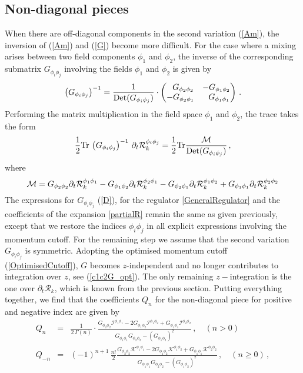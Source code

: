 \documentclass[notitlepage,eqsecnum,bm,amsmath,preprintnumbers,superscriptaddress,nofootinbib,aps,11pt]{revtex4-1}
\def\eq#1{(\ref{#1})}
\def\beq{\begin{equation}}
\def\eeq{\end{equation}}
\begin{document}
\subsection{Non-diagonal pieces}
\label{subsec:FRGNonDiagonal}
When there are off-diagonal components in the second variation \eq{Am},
the inversion of \eq{Am} and \eq{G} become more difficult. 
For the case where a mixing arises between two field components $\phi_1$ and $\phi_2$, the inverse of the corresponding submatrix $G_{\phi_i\phi_j}$ involving the fields $\phi_1$ and $\phi_2$  is given by
\begin{equation}
\left(G_{\phi_i\phi_j}
\right)^{-1}=
\frac{1}{\textnormal{Det}(G_{\phi_i\phi_j})}
\cdot\begin{pmatrix}
\ \ G_{\phi_2\phi_2} & -G_{\phi_1\phi_2} \\
-G_{\phi_2\phi_1} & \ \ G_{\phi_1\phi_1}
\end{pmatrix}  \,.
\end{equation}
Performing the matrix multiplication in the field space $\phi_1$ and $\phi_2$, the trace takes the form
\begin{equation}
\frac{1}{2}\textnormal{Tr}\,
\left(G_{\phi_i\phi_j}\right)^{-1}\,\partial_t\mathcal{R}_k^{\phi_i\phi_j}
=\frac{1}{2}\textnormal{Tr}
\frac{{\cal M}}{\textnormal{Det}(G_{\phi_i\phi_j})}
\,,
\end{equation}
where
\beq
{\cal M}=
G_{\phi_2\phi_2}\partial_t\mathcal{R}_k^{\phi_1\phi_1} 
-G_{\phi_1\phi_2} \partial_t\mathcal{R}_k^{\phi_2\phi_1}
-G_{\phi_2\phi_1} \partial_t\mathcal{R}_k^{\phi_1\phi_2}
+ G_{\phi_1\phi_1}\partial_t\mathcal{R}_k^{\phi_2\phi_2}
\eeq
The expressions for $G_{\phi_i\phi_j}$ \eq{D}, for the regulator \eqref{GeneralRegulator} and the coefficients of the expansion \eqref{partialR} remain the same as given previously, except that we restore the indices $\phi_i\phi_j$ in all explicit expressions involving the momentum cutoff. 
For the remaining step we   assume that the second variation $G_{\phi_i\phi_j}$ is symmetric. Adopting the optimised momentum cutoff \eq{OptimisedCutoff}, $G$ becomes  $z$-independent and no longer contributes to integration over $z$, see \eq{c1c2G_opt}. The only remaining $z-$integration is the one over $\partial_t\mathcal{R}_k$, which is known from the previous section. Putting everything together, 
we find that the coefficients $Q_n$ for the non-diagonal piece for positive and negative index are given by
\begin{eqnarray}
Q_n&=&\frac{1}{2\,\Gamma(n)}\cdot\frac{
G_{\phi_2\phi_2}\mathcal{I}^{\phi_1\phi_1}
-2G_{\phi_1\phi_2}\mathcal{I}^{\phi_1\phi_2}
+G_{\phi_1\phi_1}\mathcal{I}^{\phi_2\phi_2}}{G_{\phi_1\phi_1}G_{\phi_2\phi_2}-(G_{\phi_1\phi_2})^2}\,,\quad (n>0)\\
Q_{-n}&=&(-1)^{n+1}\,\frac{n!}{2}
\frac{
G_{\phi_2\phi_2}\mathcal{K}^{\phi_1\phi_1}
-2G_{\phi_1\phi_2}\mathcal{K}^{\phi_1\phi_2}
+G_{\phi_1\phi_1}\mathcal{K}^{\phi_2\phi_2}}{G_{\phi_1\phi_1}G_{\phi_2\phi_2}-(G_{\phi_1\phi_2})^2}\,,
\quad (n\ge 0)\,,
\end{eqnarray}
\end{document}
